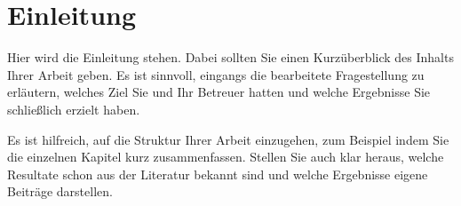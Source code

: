 \chapter*{Einleitung}

Hier wird die Einleitung stehen. Dabei sollten Sie einen Kurzüberblick des Inhalts Ihrer Arbeit geben. Es ist sinnvoll, eingangs die bearbeitete Fragestellung zu erläutern, welches Ziel Sie und Ihr Betreuer hatten und welche Ergebnisse Sie schließlich erzielt haben.

Es ist hilfreich, auf die Struktur Ihrer Arbeit einzugehen, zum Beispiel indem Sie die einzelnen Kapitel kurz zusammenfassen. Stellen Sie auch klar heraus, welche Resultate schon aus der Literatur bekannt sind und welche Ergebnisse eigene Beiträge darstellen.

